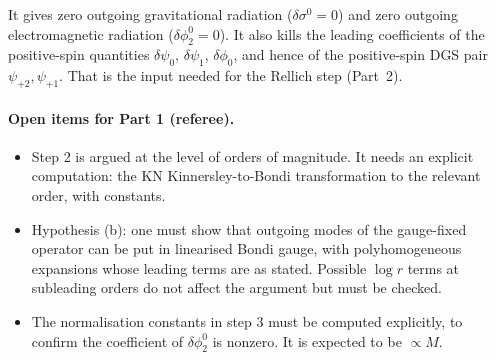 \documentclass[11pt]{article}
\begin{document}
\begin{remark}
It gives zero outgoing gravitational radiation ($\delta\sigma^0=0$) and zero outgoing electromagnetic radiation ($\delta\phi_2^0=0$). It also kills the leading coefficients of the positive-spin quantities $\delta\psi_0$, $\delta\psi_1$, $\delta\phi_0$, and hence of the positive-spin DGS pair $\psi_{+2},\psi_{+1}$. That is the input needed for the Rellich step (Part~2).
\end{remark}

\paragraph{Open items for Part 1 (referee).}
\begin{itemize}
\item[(R1)] Step 2 is argued at the level of orders of magnitude. It needs an explicit computation: the KN Kinnersley-to-Bondi transformation to the relevant order, with constants.
\item[(R2)] Hypothesis (b): one must show that outgoing modes of the gauge-fixed operator can be put in linearised Bondi gauge, with polyhomogeneous expansions whose leading terms are as stated. Possible $\log r$ terms at subleading orders do not affect the argument but must be checked.
\item[(R3)] The normalisation constants in step 3 must be computed explicitly, to confirm the coefficient of $\delta\phi_2^0$ is nonzero. It is expected to be $\propto M$.
\end{itemize}
\end{document}
